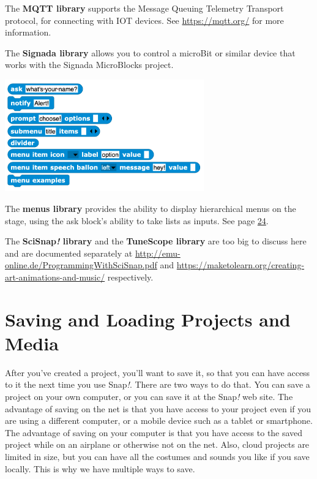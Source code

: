 The \textbf{MQTT library} supports the Message Queuing Telemetry
Transport protocol, for connecting with IOT devices. See
\url{https://mqtt.org/} for more information.

The \textbf{Signada library} allows you to control a microBit or similar
device that works with the Signada MicroBlocks project.

\includegraphics[width=3.39in,height=1.9in]{media/image486.png}

The \textbf{menus library} provides the ability to display hierarchical
menus on the stage, using the ask block's ability to take lists as
inputs. See page \hyperref[ask_lists]{24}.

The \textbf{SciSnap\emph{!} library} and the \textbf{TuneScope library}
are too big to discuss here and are documented separately at
\url{http://emu-online.de/ProgrammingWithSciSnap.pdf} and
\url{https://maketolearn.org/creating-art-animations-and-music/}
respectively.

\section{Saving and Loading Projects and
Media}\label{saving-and-loading-projects-and-media}

After you've created a project, you'll want to save it, so that you can
have access to it the next time you use Snap\emph{!}. There are two ways
to do that. You can save a project on your own computer, or you can save
it at the Snap\emph{!} web site. The advantage of saving on the net is
that you have access to your project even if you are using a different
computer, or a mobile device such as a tablet or smartphone. The
advantage of saving on your computer is that you have access to the
saved project while on an airplane or otherwise not on the net. Also,
cloud projects are limited in size, but you can have all the costumes
and sounds you like if you save locally. This is why we have multiple
ways to save.

